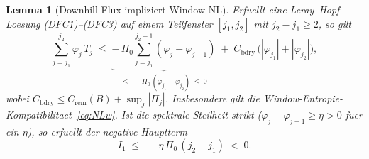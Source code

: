\documentclass[12pt,a4paper]{article}
\theoremstyle{definition}
\theoremstyle{plain}
\newtheorem{lemma}[definition]{Lemma}
\theoremstyle{remark}
\begin{document}
\begin{lemma}[Downhill Flux impliziert Window-NL]\label{lem:DFC-implies-NLw}
Erfuellt eine Leray--Hopf-Loesung \textup{(DFC1)--(DFC3)} auf einem
Teilfenster $[j_1, j_2]$ mit $j_2 - j_1 \ge 2$, so gilt
\begin{equation}\label{eq:DFC-quantitative}
  \sum_{j=j_1}^{j_2} \varphi_j\,T_j
  \;\le\;
  \underbrace{-\,\Pi_0
    \sum_{j=j_1}^{j_2-1}(\varphi_j - \varphi_{j+1})}_{\le\;
    -\,\Pi_0\,(\varphi_{j_1}-\varphi_{j_2})\;\le\; 0}
  \;+\;
  C_{\mathrm{bdry}}\,
  \bigl(|\varphi_{j_1}| + |\varphi_{j_2}|\bigr),
\end{equation}
wobei $C_{\mathrm{bdry}} \le C_{\mathrm{rem}}(B) + \sup_{j}|\Pi_j|$. Insbesondere
gilt die Window-Entropie-Kompatibilitaet~\eqref{eq:NLw}. Ist die
spektrale Steilheit strikt ($\varphi_j - \varphi_{j+1} \ge \eta > 0$
fuer ein $\eta$), so erfuellt der negative Hauptterm
\begin{equation}\label{eq:bulk-strict}
  I_1 \;\le\; -\,\eta\,\Pi_0\,(j_2 - j_1) \;<\; 0.
\end{equation}
\end{lemma}
\end{document}

